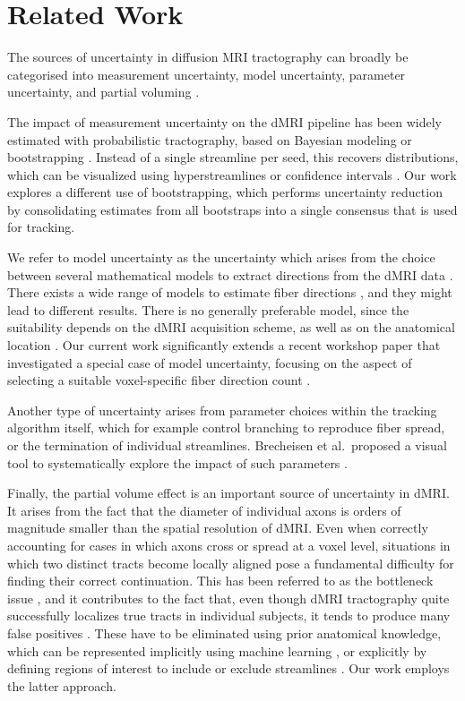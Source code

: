 \section{Related Work}\label{sec:related}
The sources of uncertainty in diffusion MRI tractography can broadly be categorised into measurement uncertainty,
model uncertainty, parameter uncertainty, and partial voluming \cite{Schultz:SciVisBook2014, Schultz:NBM2018, Gillmann:STAR2021}.

The impact of measurement
uncertainty on the dMRI pipeline has been widely estimated with probabilistic tractography, based on Bayesian modeling \cite{BEHRENS2007144} or bootstrapping \cite{Jones:2008}. Instead of a single streamline per seed, this recovers distributions,
which can be visualized using hyperstreamlines \cite{Jones:2005b,Jeurissen:2012, Wiens:2014}
or confidence intervals \cite{Brecheisen:2013,Siddiqui:2021}. Our work explores a different use of bootstrapping, which performs uncertainty reduction by consolidating estimates from all bootstraps into a single consensus that is used for tracking.

We refer to model uncertainty as the uncertainty which arises from the choice
between several mathematical models to extract directions from the dMRI data
\cite{Schultz:SciVisBook2014}. There exists a wide range of models to estimate
fiber directions \cite{Panagiotaki:2012}, and they might lead to different
results. There is no generally preferable model, since the suitability depends  on the dMRI acquisition scheme, as well as on
the anatomical location \cite{Bretthorst:2004,Freidlin:2007}. Our current work significantly extends a recent workshop paper that investigated a special case of model uncertainty, focusing on the aspect of selecting a suitable voxel-specific fiber direction count \cite{Gruen:2021}. 

Another type of uncertainty arises from parameter choices within the tracking algorithm itself, which for example control branching to reproduce fiber spread, or the termination of individual streamlines. Brecheisen et al.\ proposed
a visual
tool to systematically explore the impact of such parameters
\cite{Brecheisen:2009}.

Finally, the partial volume effect is
an important source of uncertainty in dMRI. It arises from the fact that the diameter of individual axons is orders of magnitude smaller than the spatial resolution of dMRI. Even when correctly accounting for cases in which axons cross \cite{Alexander:2001,BEHRENS2007144} or spread \cite{Kaden:2007} at a voxel level, situations in which two distinct tracts become locally aligned pose a fundamental difficulty for finding their correct continuation. This has been referred to as the bottleneck issue \cite{Schilling:2022}, and it contributes to the fact that, even though dMRI tractography quite successfully localizes true tracts in individual subjects, it tends to produce many false positives \cite{MaierHein:2017}. These have to be eliminated using prior anatomical knowledge, which can be represented implicitly using machine learning \cite{WASSERTHAL2018239}, or explicitly by defining regions of interest to include or exclude streamlines \cite{Wakana:2007}. Our work employs the latter approach.

